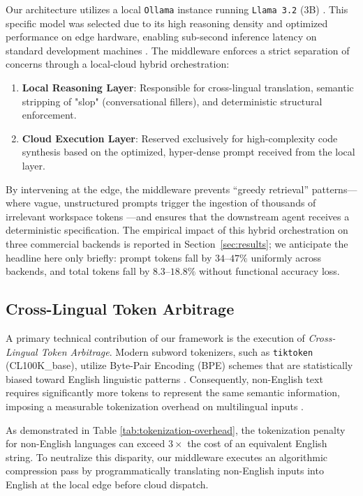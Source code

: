 \documentclass[11pt,a4paper,twocolumn]{article}
\begin{document}
Our architecture utilizes a local \texttt{Ollama} instance running \texttt{Llama 3.2} (3B) \cite{meta2024llama32}. This specific model was selected due to its high reasoning density and optimized performance on edge hardware, enabling sub-second inference latency on standard development machines \cite{meta2024llama32}. The middleware enforces a strict separation of concerns through a local-cloud hybrid orchestration:
\begin{enumerate}
    \item \textbf{Local Reasoning Layer}: Responsible for cross-lingual translation, semantic stripping of "slop" (conversational fillers), and deterministic structural enforcement.
    \item \textbf{Cloud Execution Layer}: Reserved exclusively for high-complexity code synthesis based on the optimized, hyper-dense prompt received from the local layer.
\end{enumerate}

By intervening at the edge, the middleware prevents ``greedy retrieval'' patterns---where vague, unstructured prompts trigger the ingestion of thousands of irrelevant workspace tokens \cite{jimenez2024swebench}---and ensures that the downstream agent receives a deterministic specification. The empirical impact of this hybrid orchestration on three commercial backends is reported in Section~\ref{sec:results}; we anticipate the headline here only briefly: prompt tokens fall by $34$--$47\%$ uniformly across backends, and total tokens fall by $8.3$--$18.8\%$ without functional accuracy loss.

\subsection{Cross-Lingual Token Arbitrage}
A primary technical contribution of our framework is the execution of \textit{Cross-Lingual Token Arbitrage}. Modern subword tokenizers, such as \texttt{tiktoken} (CL100K\_base), utilize Byte-Pair Encoding (BPE) schemes that are statistically biased toward English linguistic patterns \cite{teklehaymanot2025tokenization}. Consequently, non-English text requires significantly more tokens to represent the same semantic information, imposing a measurable tokenization overhead on multilingual inputs \cite{petrov2023language}.

As demonstrated in Table \ref{tab:tokenization-overhead}, the tokenization penalty for non-English languages can exceed $3\times$ the cost of an equivalent English string. To neutralize this disparity, our middleware executes an algorithmic compression pass by programmatically translating non-English inputs into English at the local edge before cloud dispatch. 
\end{document}
